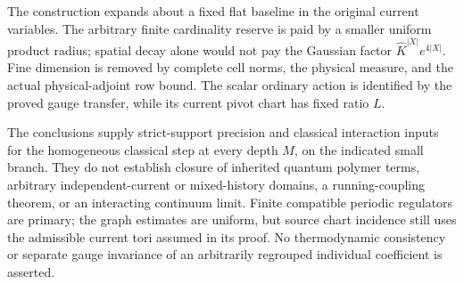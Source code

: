 The construction expands about a fixed flat baseline in the original
current variables. The arbitrary finite cardinality reserve is paid by
a smaller uniform product radius; spatial decay alone would not pay
the Gaussian factor $\widehat K^{|X|}e^{4|X|}$. Fine dimension is removed
by complete cell norms, the physical measure, and the actual
physical-adjoint row bound. The scalar ordinary action is identified by
the proved gauge transfer, while its current pivot chart has fixed
ratio $L$.

The conclusions supply strict-support precision and classical
interaction inputs for the homogeneous classical step at every depth
$M$, on the indicated small branch. They do not establish closure of
inherited quantum polymer terms, arbitrary independent-current or
mixed-history domains, a running-coupling theorem, or an interacting
continuum limit. Finite compatible periodic regulators are primary;
the graph estimates are uniform, but source chart incidence still uses
the admissible current tori assumed in its proof. No thermodynamic
consistency or separate gauge invariance of an arbitrarily regrouped
individual coefficient is asserted.

